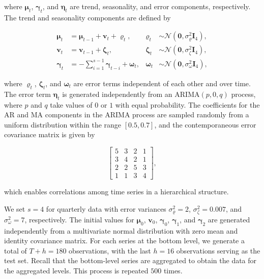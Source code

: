 \documentclass[11pt,a4paper,]{article}
\begin{document}
where \(\boldsymbol{\mu}_t\), \(\boldsymbol{\gamma}_t\), and
\(\boldsymbol{\eta}_t\) are trend, seasonality, and error components,
respectively. The trend and seasonality components are defined by

\[
\begin{aligned}
\boldsymbol{\mu}_t & =\boldsymbol{\mu}_{t-1}+\boldsymbol{v}_t+\boldsymbol{\varrho}_t, & \boldsymbol{\varrho}_t & \sim \mathcal{N}\left(\boldsymbol{0}, \sigma_{\varrho}^2 \boldsymbol{I}_4\right), \\
\boldsymbol{v}_t & =\boldsymbol{v}_{t-1}+\boldsymbol{\zeta}_t, & \boldsymbol{\zeta}_t & \sim \mathcal{N}\left(\boldsymbol{0}, \sigma_\zeta^2 \boldsymbol{I}_4\right), \\
\boldsymbol{\gamma}_t & =-\sum_{i=1}^{s-1} \boldsymbol{\gamma}_{t-i}+\boldsymbol{\omega}_t, & \boldsymbol{\omega}_t & \sim \mathcal{N}\left(\boldsymbol{0}, \sigma_\omega^2 \boldsymbol{I}_4\right),
\end{aligned}
\]

where \(\boldsymbol{\varrho}_t\), \(\boldsymbol{\zeta}_t\), and
\(\boldsymbol{\omega}_t\) are error terms independent of each other and
over time. The error term \(\boldsymbol{\eta}_t\) is generated
independently from an \(\text{ARIMA}(p,0,q)\) process, where \(p\) and
\(q\) take values of \(0\) or \(1\) with equal probability. The
coefficients for the AR and MA components in the ARIMA process are
sampled randomly from a uniform distribution within the range
\([0.5, 0.7]\), and the contemporaneous error covariance matrix is given
by

\[
\left[\begin{array}{llll}
5 & 3 & 2 & 1 \\
3 & 4 & 2 & 1 \\
2 & 2 & 5 & 3 \\
1 & 1 & 3 & 4
\end{array}\right],
\]

which enables correlations among time series in a hierarchical
structure.

We set \(s = 4\) for quarterly data with error variances
\(\sigma_{\varrho}^2=2\), \(\sigma_\zeta^2=0.007\), and
\(\sigma_\omega^2=7\), respectively. The initial values for
\(\boldsymbol{\mu}_0\), \(\boldsymbol{v}_0\), \(\boldsymbol{\gamma}_0\),
\(\boldsymbol{\gamma}_1\), and \(\boldsymbol{\gamma}_2\) are generated
independently from a multivariate normal distribution with zero mean and
identity covariance matrix. For each series at the bottom level, we
generate a total of \(T+h = 180\) observations, with the last \(h = 16\)
observations serving as the test set. Recall that the bottom-level
series are aggregated to obtain the data for the aggregated levels. This
process is repeated \(500\) times.
\end{document}
